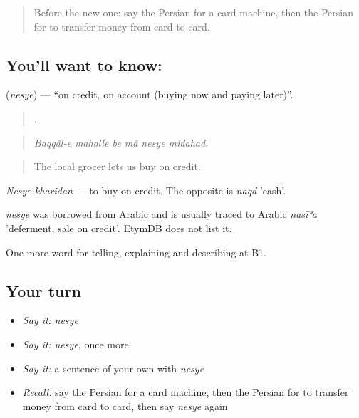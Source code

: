 \label{lesson:FA-C461-nesye}



\begin{quote}
Before the new one: say the Persian for a card machine, then the Persian for to transfer money from card to card.
\end{quote}

\subsection*{You'll want to know: }
\textbf{} (\emph{nesye}) — \textquotedblleft{}on credit, on account (buying now and paying later)\textquotedblright{}.

\begin{quote}
     .
\end{quote}

\begin{quote}
\emph{Baqqâl-e mahalle be mâ nesye midahad.}
\end{quote}

\begin{quote}
The local grocer lets us buy on credit.
\end{quote}

\emph{Nesye kharidan} — to buy on credit. The opposite is \emph{naqd} 'cash'.

\begin{cousinweb}
\emph{nesye} was borrowed from Arabic and is usually traced to Arabic \emph{nasīʾa} 'deferment, sale on credit'. EtymDB does not list it.
\end{cousinweb}

\begin{grammarlens}[title={What you've built}]
One more word for telling, explaining and describing at B1.
\end{grammarlens}

\subsection*{Your turn}
\begin{itemize}
\raggedright
  \item \emph{Say it:} \emph{nesye}
  \item \emph{Say it:} \emph{nesye}, once more
  \item \emph{Say it:} a sentence of your own with \emph{nesye}
  \item \emph{Recall:} say the Persian for a card machine, then the Persian for to transfer money from card to card, then say \emph{nesye} again
\end{itemize}

